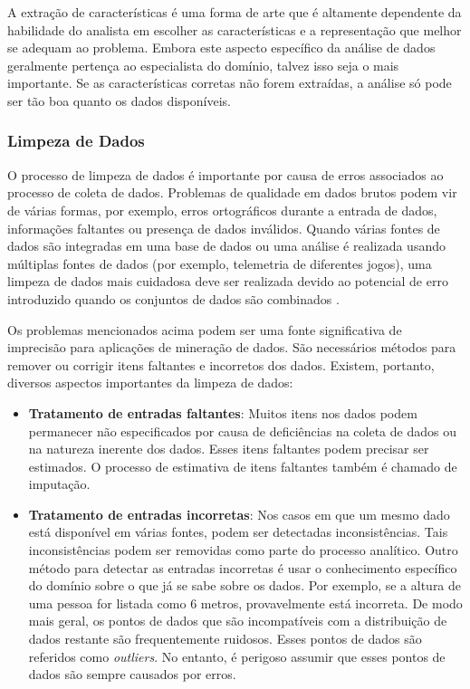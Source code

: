 A extração de características é uma forma de arte que é altamente dependente da habilidade do analista em escolher as características e a representação que melhor se adequam ao problema. Embora este aspecto específico da análise de dados geralmente pertença ao especialista do domínio, talvez isso seja o mais importante. Se as características corretas não forem extraídas, a análise só pode ser tão boa quanto os dados disponíveis.

\subsubsection{Limpeza de Dados}
O processo de limpeza de dados é importante por causa de erros associados ao processo de coleta de dados. Problemas de qualidade em dados brutos podem vir de várias formas, por exemplo, erros ortográficos durante a entrada de dados, informações faltantes ou presença de dados inválidos. Quando várias fontes de dados são integradas em uma base de dados ou uma análise  é realizada usando múltiplas fontes de dados (por exemplo, telemetria de diferentes jogos), uma limpeza de dados mais cuidadosa  deve ser realizada devido ao potencial de erro introduzido quando os conjuntos de dados são combinados \cite{el2016game}.

Os problemas mencionados acima podem ser uma fonte significativa de imprecisão para aplicações de mineração de dados. São necessários métodos para remover ou corrigir itens faltantes e incorretos dos dados. Existem, portanto, diversos aspectos importantes da limpeza de dados:

\begin{itemize}
  \item
\textbf{Tratamento de entradas faltantes}: Muitos itens nos dados podem permanecer não especificados por causa de deficiências na coleta de dados ou na natureza inerente dos dados. Esses itens faltantes podem precisar ser estimados. O processo de estimativa de itens faltantes também é chamado de imputação.
  \item
\textbf{Tratamento de entradas incorretas}: Nos casos em que um mesmo dado está disponível em várias fontes, podem ser detectadas inconsistências. Tais inconsistências podem ser removidas como parte do processo analítico. Outro método para detectar as entradas incorretas é usar o conhecimento específico do domínio sobre o que já se sabe sobre os dados. Por exemplo, se a altura de uma pessoa for listada como 6 metros, provavelmente está incorreta. De modo mais geral, os pontos de dados que são incompatíveis com a distribuição de dados restante são frequentemente ruidosos. Esses pontos de dados são referidos como \textit{outliers}. No entanto, é perigoso assumir que esses pontos de dados são sempre causados por erros.
\end{itemize}

